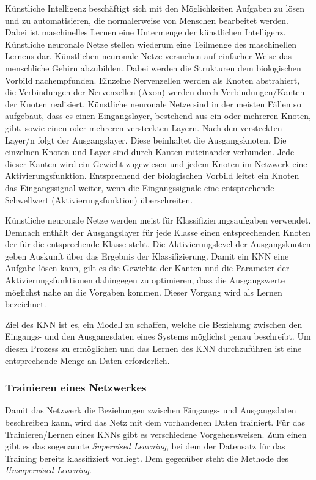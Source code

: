 \documentclass[11pt]{article}
\begin{document}
Künstliche Intelligenz beschäftigt sich mit den Möglichkeiten Aufgaben zu lösen und zu automatisieren, die normalerweise von Menschen bearbeitet werden. Dabei ist maschinelles Lernen eine Untermenge der künstlichen Intelligenz. Künstliche neuronale Netze stellen wiederum eine Teilmenge des maschinellen Lernens dar. Künstlichen neuronale Netze versuchen auf einfacher Weise das menschliche Gehirn abzubilden. Dabei werden die Strukturen dem biologischen Vorbild nachempfunden. Einzelne Nervenzellen werden als Knoten abstrahiert, die Verbindungen der Nervenzellen (Axon) werden durch Verbindungen/Kanten der Knoten realisiert. Künstliche neuronale Netze sind in der meisten Fällen so aufgebaut, dass es einen Eingangslayer, bestehend aus ein oder mehreren Knoten, gibt, sowie einen oder mehreren versteckten Layern. Nach den versteckten Layer/n folgt der Ausgangslayer. Diese beinhaltet die Ausgangsknoten. Die einzelnen Knoten und Layer sind durch Kanten miteinander verbunden. Jede dieser Kanten wird ein Gewicht zugewiesen und jedem Knoten im Netzwerk eine Aktivierungsfunktion. Entsprechend der biologischen Vorbild leitet ein Knoten das Eingangssignal weiter, wenn die Eingangssignale eine entsprechende Schwellwert (Aktivierungsfunktion) überschreiten.

Künstliche neuronale Netze werden meist für Klassifizierungsaufgaben verwendet. Demnach enthält der Ausgangslayer für jede Klasse einen entsprechenden Knoten der für die entsprechende Klasse steht. Die Aktivierungslevel der Ausgangsknoten geben Auskunft über das Ergebnis der Klassifizierung.  Damit ein KNN eine Aufgabe lösen kann, gilt es die Gewichte der Kanten und die Parameter der Aktivierungsfunktionen dahingegen zu optimieren, dass die Ausgangswerte möglichst nahe an die Vorgaben kommen. Dieser Vorgang wird als Lernen bezeichnet.

Ziel des KNN ist es, ein Modell zu schaffen, welche die Beziehung zwischen den Eingangs- und den Ausgangsdaten eines Systems möglichst genau beschreibt. Um diesen Prozess zu ermöglichen und das Lernen des KNN durchzuführen ist eine entsprechende Menge an Daten erforderlich.\parencite{M.AnderssonM.Arvola}\parencite{Chollet2017}

\subsubsection{Trainieren eines Netzwerkes}

Damit das Netzwerk die Beziehungen zwischen Eingangs- und Ausgangsdaten beschreiben kann, wird das Netz mit dem vorhandenen Daten trainiert. Für das Trainieren/Lernen eines KNNs gibt es verschiedene Vorgehensweisen. Zum einen gibt es das sogenannte \textit{Supervised Learning}, bei dem der Datensatz für das Training bereits klassifiziert vorliegt. Dem gegenüber steht die Methode des \textit{Unsupervised Learning}.
\end{document}
